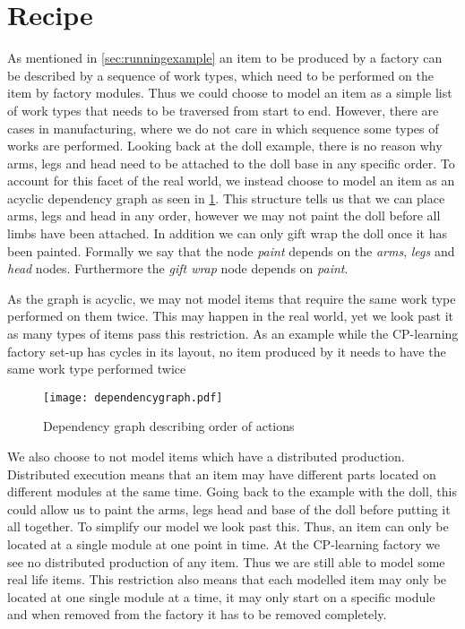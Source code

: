 \section{Recipe}\label{sec:recipe}
As mentioned in \cref{sec:runningexample} an item to be produced by a factory can be described by a sequence of work types, which need to be performed on the item by factory modules. Thus we could choose to model an item as a simple list of work types that needs to be traversed from start to end. However, there are cases in manufacturing, where we do not care in which sequence some types of works are performed. Looking back at the doll example, there is no reason why arms, legs and head need to be attached to the doll base in any specific order. To account for this facet of the real world, we instead choose to model an item as an acyclic dependency graph as seen in \cref{fig:dependency-graph}. This structure tells us that we can place arms, legs and head in any order, however we may not paint the doll before all limbs have been attached. In addition we can only gift wrap the doll once it has been painted. Formally we say that the node \textit{paint} depends on the \textit{arms}, \textit{legs} and \textit{head} nodes. Furthermore the \textit{gift wrap} node depends on \textit{paint}. 

As the graph is acyclic, we may not model items that require the same work type performed on them twice. This may happen in the real world, yet we look past it as many types of items pass this restriction. As an example while the CP-learning factory set-up has cycles in its layout, no item produced by it needs to have the same work type performed twice  

\begin{figure}[h]
\centering
\texttt{[image: dependencygraph.pdf]}
\caption{Dependency graph describing order of actions}
\label{fig:dependency-graph}
\end{figure}

We also choose to not model items which have a distributed production. Distributed execution means that an item may have different parts located on different modules at the same time. Going back to the example with the doll, this could allow us to paint the arms, legs head and base of the doll before putting it all together. To simplify our model we look past this. Thus, an item can only be located at a single module at one point in time. At the CP-learning factory we see no distributed production of any item. Thus we are still able to model some real life items. This restriction also means that each modelled item may only be located at one single module at a time, it may only start on a specific module and when removed from the factory it has to be removed completely.

